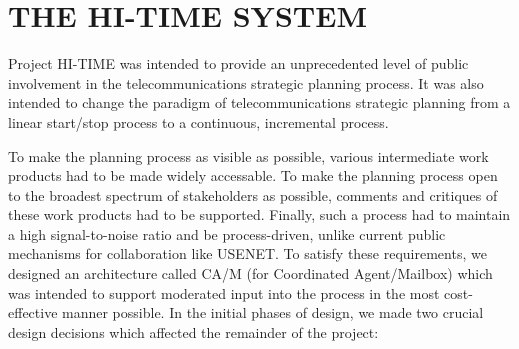 
\section{THE HI-TIME SYSTEM}

Project HI-TIME was intended to provide an unprecedented level of public
involvement in the telecommunications strategic planning process.  It was
also intended to change the paradigm of telecommunications strategic
planning from a linear start/stop process to a continuous, incremental
process.

To make the planning process as visible as possible, various intermediate
work products had to be made widely accessable. To make the planning process
open to the broadest spectrum of stakeholders as possible, comments and
critiques of these work products had to be supported. Finally, such a process
had to maintain a high signal-to-noise ratio and be process-driven, unlike
current public mechanisms for collaboration like USENET.  To satisfy these
requirements, we designed an architecture called CA/M (for Coordinated
Agent/Mailbox) which was intended to support moderated input into the
process in the most cost-effective manner possible.  In the initial
phases of design, we made two crucial design decisions which affected
the remainder of the project:

